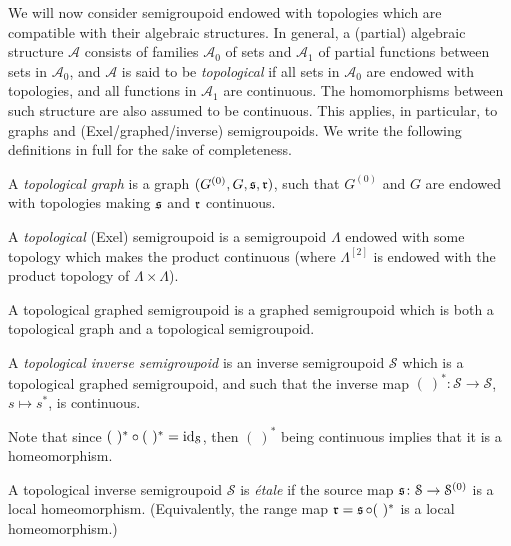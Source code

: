 We will now consider semigroupoid endowed with topologies which are compatible with their algebraic structures. In general, a (partial) algebraic structure $\mathscr{A}$ consists of families $\mathscr{A}_0$ of sets and $\mathscr{A}_1$ of partial functions between sets in $\mathscr{A}_0$, and $\mathscr{A}$ is said to be \emph{topological} if all sets in $\mathscr{A}_0$ are endowed with topologies, and all functions in $\mathscr{A}_1$ are continuous. The homomorphisms between such structure are also assumed to be continuous. This applies, in particular, to graphs and (Exel/graphed/inverse) semigroupoids. We write the following definitions in full for the sake of completeness.

\begin{definition}
A \emph{topological graph} is a graph $(G^{(0)},G,\operatorname{\mathfrak{s}},\operatorname{\mathfrak{r}})$, such that $G^{(0)}$ and $G$ are endowed with topologies making $\operatorname{\mathfrak{s}}$ and $\operatorname{\mathfrak{r}}$ continuous.

A \emph{topological} (Exel) semigroupoid is a semigroupoid $\Lambda$ endowed with some topology which makes the product continuous (where $\Lambda^{[2]}$ is endowed with the product topology of $\Lambda\times\Lambda$).

A topological graphed semigroupoid is a graphed semigroupoid which is both a topological graph and a topological semigroupoid.
\end{definition}

\begin{definition}
A \emph{topological inverse semigroupoid} is an inverse semigroupoid $\mathcal{S}$ which is a topological graphed semigroupoid, and such that the inverse map $(\ )^*\colon\mathcal{S}\to\mathcal{S}$, $s\mapsto s^*$, is continuous.
\end{definition}

Note that since $(\ )^*\circ (\ )^*=\id_{\mathcal{S}}$, then $(\ )^*$ being continuous implies that it is a homeomorphism.

\begin{definition}\label{def:etaleinversesemigroupoid}
A topological inverse semigroupoid $\mathcal{S}$ is \emph{étale} if the source map $\operatorname{\mathfrak{s}}\colon\mathcal{S}\to\mathcal{S}^{(0)}$ is a local homeomorphism. (Equivalently, the range map $\operatorname{\mathfrak{r}}=\operatorname{\mathfrak{s}}\circ(\ )^*$ is a local homeomorphism.)
\end{definition}

